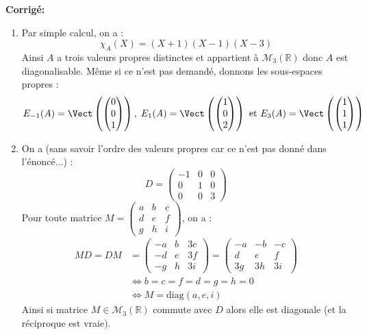 \documentclass[a4paper,twoside,french,10pt]{VcCours}
\newcommand{\corr}{\textbf{Corrigé:}}
\begin{document}
\corr 

\begin{enumerate}
\item Par simple calcul, on a :
$$ \chi_A(X)=(X+1)(X-1)(X-3)$$
Ainsi $A$ a trois valeurs propres distinctes et appartient à $\mathcal{M}_3(\mathbb{R})$ donc $A$ est diagonalisable. Même si ce n'est pas demandé, donnons les sous-espaces propres :
$$ E_{-1}(A) = \Vect \left( \begin{pmatrix}
0 \\
0 \\
1
\end{pmatrix} \right), \; E_{1}(A) = \Vect \left( \begin{pmatrix}
1 \\
0 \\
2
\end{pmatrix} \right) \hbox{ et } E_{3}(A) = \Vect \left( \begin{pmatrix}
1 \\
1 \\
1
\end{pmatrix} \right) $$
\item On a (sans savoir l'ordre des valeurs propres car ce n'est pas donné dans l'énoncé...) :
$$ D = \begin{pmatrix}
-1 & 0 & 0 \\
0 & 1& 0 \\
0 & 0 & 3
\end{pmatrix}$$
Pour toute matrice $M = \begin{pmatrix}
a & b & c \\
d & e & f \\
g & h & i 
\end{pmatrix}$, on a :
\begin{align*}
MD=DM & =\begin{pmatrix}
-a & b & 3c \\
-d & e & 3f \\
-g & h & 3i 
\end{pmatrix} = \begin{pmatrix}
-a &- b & -c \\
d & e & f \\
3g & 3h & 3i 
\end{pmatrix} \\
& \Longleftrightarrow b=c=f=d=g=h=0 \\
& \Longleftrightarrow M= \textrm{diag}(a,e,i) 
\end{align*}
Ainsi si matrice $M \in \mathcal{M}_3(\mathbb{R})$ commute avec $D$ alors elle est diagonale (et la réciproque est vraie).

\end{enumerate}
\end{document}
